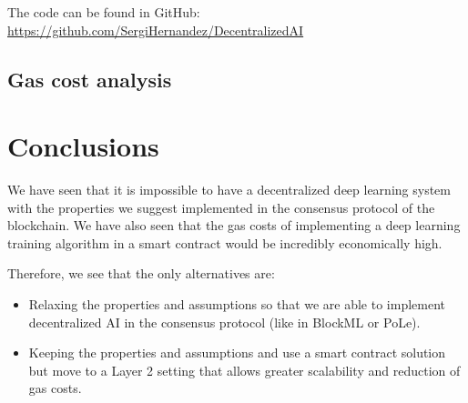 \documentclass[conference]{IEEEtran}
\begin{document}
The code can be found in GitHub: \url{https://github.com/SergiHernandez/DecentralizedAI}

\subsection{Gas cost analysis}

\section{Conclusions}


We have seen that it is impossible to have a decentralized deep learning system with the properties we suggest implemented in the consensus protocol of the blockchain. We have also seen that the gas costs of implementing a deep learning training algorithm in a smart contract would be incredibly economically high.

Therefore, we see that the only alternatives are:
\begin{itemize}
\item Relaxing the properties and assumptions so that we are able to implement decentralized AI in the consensus protocol (like in BlockML or PoLe).
\item Keeping the properties and assumptions and use a smart contract solution but move to a Layer 2 setting that allows greater scalability and reduction of gas costs.
\end{itemize}
\end{document}
